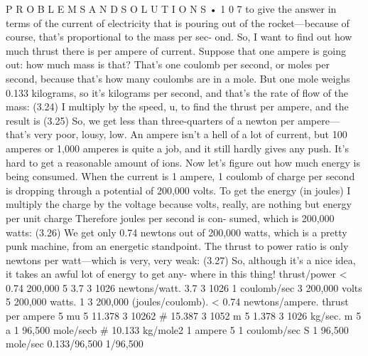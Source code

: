 \documentclass[10pt,oneside]{article}
\begin{document}
P R O B L E M S  A N D  S O L U T I O N S • 1 0 7 to give the answer in terms of the current of electricity that is pouring out of the rocket---because of course, that’s proportional to the mass per sec- ond. So, I want to find out how much thrust there is per ampere of current. Suppose that one ampere is going out: how much mass is that? That’s one coulomb per second, or moles per second, because that’s how many coulombs are in a mole. But one mole weighs 0.133 kilograms, so it’s kilograms per second, and that’s the rate of flow of the mass: (3.24) I multiply by the speed, u, to find the thrust per ampere, and the result is (3.25) So, we get less than three-quarters of a newton per ampere---that’s very poor, lousy, low. An ampere isn’t a hell of a lot of current, but 100 amperes or 1,000 amperes is quite a job, and it still hardly gives any push. It’s hard to get a reasonable amount of ions. Now let’s figure out how much energy is being consumed. When the current is 1 ampere, 1 coulomb of charge per second is dropping through a potential of 200,000 volts. To get the energy (in joules) I multiply the charge by the voltage because volts, really, are nothing but energy per unit charge Therefore joules per second is con- sumed, which is 200,000 watts: (3.26) We get only 0.74 newtons out of 200,000 watts, which is a pretty punk machine, from an energetic standpoint. The thrust to power ratio is only newtons per watt---which is very, very weak: (3.27) So, although it’s a nice idea, it takes an awful lot of energy to get any- where in this thing! thrust/power < 0.74 200,000 5 3.7 3 1026 newtons/watt. 3.7 3 1026 1 coulomb/sec 3 200,000 volts 5 200,000 watts. 1 3 200,000 (joules/coulomb). < 0.74 newtons/ampere. thrust per ampere 5 mu 5 11.378 3 10262 \# 15.387 3 1052 m 5 1.378 3 1026 kg/sec. m 5 a 1 96,500 mole/secb \# 10.133 kg/mole2 1 ampere 5  1 coulomb/sec S 1 96,500 mole/sec 0.133/96,500 1/96,500\par
\end{document}
